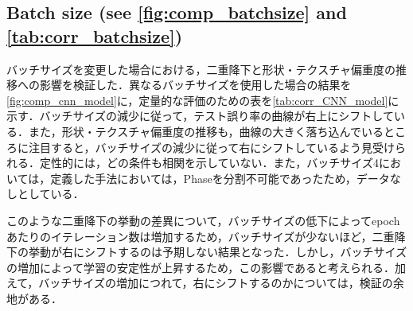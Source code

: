 \newpage

\subsection[Batch size]{Batch size (see \cref{fig:comp_batchsize} and \cref{tab:corr_batchsize})}
バッチサイズを変更した場合における，二重降下と形状・テクスチャ偏重度の推移への影響を検証した．異なるバッチサイズを使用した場合の結果を\cref{fig:comp_cnn_model}に，定量的な評価のための表を\cref{tab:corr_CNN_model}に示す．バッチサイズの減少に従って，テスト誤り率の曲線が右上にシフトしている．また，形状・テクスチャ偏重度の推移も，曲線の大きく落ち込んでいるところに注目すると，バッチサイズの減少に従って右にシフトしているよう見受けられる．定性的には，どの条件も相関を示していない．また，バッチサイズ4においては，定義した手法においては，Phaseを分割不可能であったため，データなしとしている．

このような二重降下の挙動の差異について，バッチサイズの低下によってepochあたりのイテレーション数は増加するため，バッチサイズが少ないほど，二重降下の挙動が右にシフトするのは予期しない結果となった．しかし，バッチサイズの増加によって学習の安定性が上昇するため，この影響であると考えられる．加えて，バッチサイズの増加につれて，右にシフトするのかについては，検証の余地がある．

